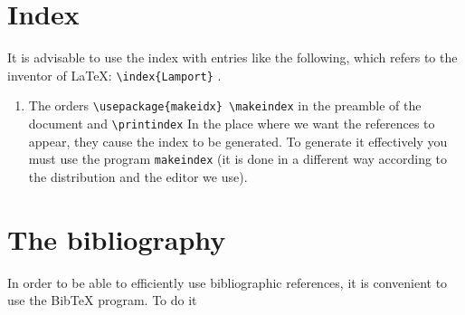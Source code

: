 \section*{Index}

It is advisable to use the index with entries like the following, which refers to the inventor of \LaTeX:  \verb+\index{Lamport}+ . 
\begin{enumerate}
\item The orders \verb+\usepackage{makeidx} \makeindex+ in the preamble of the document and \verb+\printindex+ In the place where we want the references to appear, they cause the index to be generated. To generate it effectively you must use the program \verb+makeindex+ (it is done in a different way according to the distribution and the editor we use).
\end{enumerate}

\section*{The bibliography}
In order to be able to efficiently use bibliographic references, it is convenient to use the BibTeX program. To do it 


